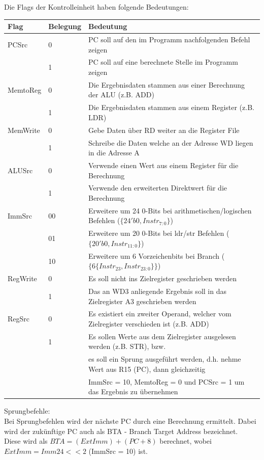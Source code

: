 \documentclass[a4paper,12pt,leqno]{article}
\begin{document}
Die Flags der Kontrolleinheit haben folgende Bedeutungen:\\
{\footnotesize
\begin{tabular}{|l|l|l|}
\hline
Flag & Belegung & Bedeutung\\
\hline
PCSrc 	& 0 & PC soll auf den im Programm nachfolgenden Befehl zeigen\\
 		& 1 & PC soll auf eine berechnete Stelle im Programm zeigen\\
\hline
MemtoReg & 0 & Die Ergebnisdaten stammen aus einer Berechnung der ALU (z.B. ADD)\\
		& 1 & Die Ergebnisdaten stammen aus einem Register (z.B. LDR)\\
\hline
MemWrite & 0 & Gebe Daten über RD weiter an die Register File\\
		& 1 & Schreibe die Daten welche an der Adresse WD liegen in die Adresse A\\
\hline
ALUSrc & 0 & Verwende einen Wert aus einem Register für die Berechnung\\
	 & 1 &  Verwende den erweiterten Direktwert für die Berechnung\\
\hline
ImmSrc & 00 & Erweitere um 24 0-Bits bei arithmetischen/logischen Befehlen ($\{24'b0, Instr_{7:0}\}$)\\
	 & 01 & Erweitere um 20 0-Bits bei ldr/str Befehlen ($\{20'b0, Instr_{11:0}\}$)\\
	 & 10 & Erweitere um 6 Vorzeichenbits bei Branch ($\{6\{Instr_{23}, Instr_{23:0}\}\}$)\\
\hline
RegWrite & 0 & Es soll nicht ins Zielregister geschrieben werden\\
		& 1 & Das an WD3 anliegende Ergebnis soll in das Zielregister A3 geschrieben werden\\
\hline
RegSrc & 0 & Es existiert ein zweiter Operand, welcher vom Zielregister verschieden ist (z.B. ADD)\\
		& 1 & Es sollen Werte aus dem Zielregister ausgelesen werden (z.B. STR), bzw.\\
		& & es soll ein Sprung ausgeführt werden, d.h. nehme Wert aus R15 (PC), dann gleichzeitig\\
		& & ImmSrc = 10, MemtoReg = 0 und PCSrc = 1 um das Ergebnis zu übernehmen\\
\hline
\end{tabular}
}

Sprungbefehle:\\
Bei Sprungbefehlen wird der nächste PC durch eine Berechnung ermittelt. Dabei wird der zukünftige PC auch als BTA - Branch Target Address bezeichnet.\\
Diese wird als $BTA = (ExtImm) + (PC + 8)$ berechnet, wobei $ExtImm = Imm24 << 2$ (ImmSrc = 10) ist.
\end{document}
